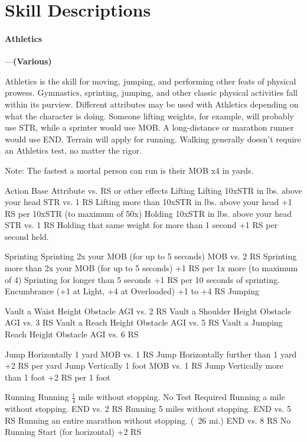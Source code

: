 \documentclass[oneside,11pt,english]{book}
\begin{document}
\section{Skill Descriptions}
\paragraph{\label{skill:Athletics}Athletics}---\quad\textbf{(Various)}\par%
Athletics is the skill for moving, jumping, and performing other feats of physical prowess. Gymnastics, sprinting, jumping, and other classic physical activities fall within its purview. Different attributes may be used with Athletics depending on what the character is doing. Someone lifting weights, for example, will probably use STR, while a sprinter would use MOB. A long-distance or marathon runner would use END. Terrain will apply for running. Walking generally doesn’t require an Athletics test, no matter the rigor.


Note: The fastest a mortal person can run is their MOB x4 in yards.


Action Base Attribute vs. RS or other effects 
Lifting
Lifting 10xSTR in lbs. above your head STR vs. 1 RS 
Lifting more than 10xSTR in lbs. above your head +1 RS per 10xSTR (to maximum of 50x) 
Holding 10xSTR in lbs. above your head STR vs. 1 RS 
Holding that same weight for more than 1 second +1 RS per second held. 


Sprinting 
Sprinting 2x your MOB (for up to 5 seconds) MOB vs. 2 RS 
Sprinting more than 2x your MOB (for up to 5 seconds) +1 RS per 1x more (to maximum of 4) 
Sprinting for longer than 5 seconds +1 RS per 10 seconds of sprinting. 
Encumbrance (+1 at Light, +4 at Overloaded) +1 to +4 RS 
Jumping 


Vault a Waist Height Obstacle AGI vs. 2 RS 
Vault a Shoulder Height Obstacle AGI vs. 3 RS 
Vault a Reach Height Obstacle AGI vs. 5 RS 
Vault a Jumping Reach Height Obstacle AGI vs. 6 RS 


Jump Horizontally 1 yard MOB vs. 1 RS 
Jump Horizontally further than 1 yard +2 RS per yard 
Jump Vertically 1 foot MOB vs. 1 RS 
Jump Vertically more than 1 foot +2 RS per 1 foot 


Running
Running $ \frac{1}{4} $ mile without stopping. No Test Required 
Running a mile without stopping. END vs. 2 RS 
Running 5 miles without stopping. END vs. 5 RS 
Running an entire marathon without stopping. (~26 mi.) END vs. 8 RS 
No Running Start (for horizontal) +2 RS 
\end{document}
